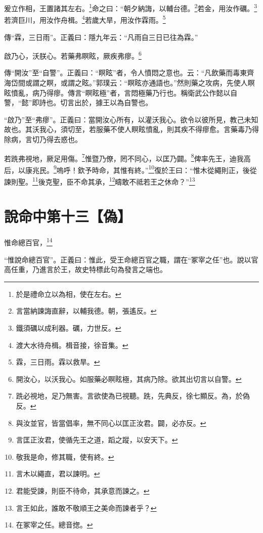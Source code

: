 爰立作相，王置諸其左右。\footnote{於是禮命立以為相，使在左右。}命之曰：“朝夕納誨，以輔台德。\footnote{言當納諫誨直辭，以輔我德。朝，張遙反。}若金，用汝作礪。\footnote{鐵須礪以成利器。礪，力世反。}若濟巨川，用汝作舟楫。\footnote{渡大水待舟楫。楫音接，徐音集。}若歲大旱，用汝作霖雨。\footnote{霖，三日雨。霖以救旱。}

{\noindent\zhuan{}\fzbyks 傳“霖，三日雨”。正義曰：隱九年云：“凡雨自三日已往為霖。” \par}

啟乃心，沃朕心。若藥弗瞑眩，厥疾弗瘳。\footnote{開汝心，以沃我心。如服藥必瞑眩極，其病乃除。欲其出切言以自警。}


{\noindent\zhuan{}\fzbyks 傳“開汝”至“自警”。正義曰：“瞑眩”者，令人憤悶之意也。云：“凡飲藥而毒東齊海岱間或謂之瞑，或謂之眩。”郭璞云：“瞑眩亦通語也。”然則藥之攻病，先使人瞑眩憤亂，病乃得瘳。傳言“瞑眩極”者，言悶極藥乃行也。稱衛武公作懿以自警，“懿”即詩也。切言出於，據王以為自警也。 \par}

{\noindent\shu{}\fzkt “啟乃”至“弗瘳”。正義曰：當開汝心所有，以灌沃我心。欲令以彼所見，教己未知故也。其沃我心，須切至，若服藥不使人瞑眩憤亂，則其疾不得瘳愈。言藥毒乃得除病，言切乃得去惑也。 \par}

若跣弗視地，厥足用傷。\footnote{跣必視地，足乃無害。言欲使為已視聽。跣，先典反，徐七顯反。為，於偽反。}惟暨乃僚，罔不同心，以匡乃闢。\footnote{與汝並官，皆當倡率，無不同心以匡正汝君。闢，必亦反。}俾率先王，迪我高后，以康兆民。\footnote{言匡正汝君，使循先王之道，蹈之蹤，以安天下。}嗚呼！欽予時命，其惟有終。”\footnote{敬我是命，修其職，使有終。}復於王曰：“惟木從繩則正，後從諫則聖。\footnote{言木以繩直，君以諫明。}後克聖，臣不命其承，\footnote{君能受諫，則臣不待命，其承意而諫之。}疇敢不祗若王之休命？”\footnote{言王如此，誰敢不敬順王之美命而諫者乎？}

\section{說命中第十三【偽】}

惟命總百官，\footnote{在冢宰之任。總音揔。}

{\noindent\shu{}\fzkt “惟說命總百官”。正義曰：惟此，受王命總百官之職，謂在“冢宰之任”也。說以官高任重，乃進言於王，故史特標此句為發言之端也。 \par}

